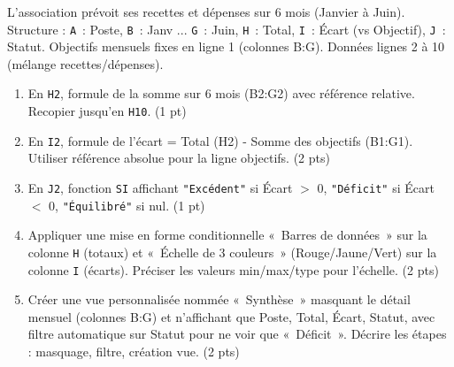 \documentclass[11pt]{article}
\begin{document}
\begin{exercice}
L'association prévoit ses recettes et dépenses sur 6 mois (Janvier à Juin). Structure : \texttt{A}~: Poste, \texttt{B}~: Janv ... \texttt{G}~: Juin, \texttt{H}~: Total, \texttt{I}~: Écart (vs Objectif), \texttt{J}~: Statut. Objectifs mensuels fixes en ligne 1 (colonnes B:G). Données lignes 2 à 10 (mélange recettes/dépenses).

\begin{enumerate}
\item En \texttt{H2}, formule de la somme sur 6 mois (B2:G2) avec référence relative. Recopier jusqu'en \texttt{H10}. (1 pt)
\item En \texttt{I2}, formule de l'écart = Total (H2) - Somme des objectifs (B1:G1). Utiliser référence absolue pour la ligne objectifs. (2 pts)
\item En \texttt{J2}, fonction \texttt{SI} affichant \texttt{"Excédent"} si Écart $>$ 0, \texttt{"Déficit"} si Écart $<$ 0, \texttt{"Équilibré"} si nul. (1 pt)
\item Appliquer une mise en forme conditionnelle «~Barres de données~» sur la colonne \texttt{H} (totaux) et «~Échelle de 3 couleurs~» (Rouge/Jaune/Vert) sur la colonne \texttt{I} (écarts). Préciser les valeurs min/max/type pour l'échelle. (2 pts)
\item Créer une vue personnalisée nommée «~Synthèse~» masquant le détail mensuel (colonnes B:G) et n'affichant que Poste, Total, Écart, Statut, avec filtre automatique sur Statut pour ne voir que «~Déficit~». Décrire les étapes : masquage, filtre, création vue. (2 pts)
\end{enumerate}
\end{exercice}
\end{document}
